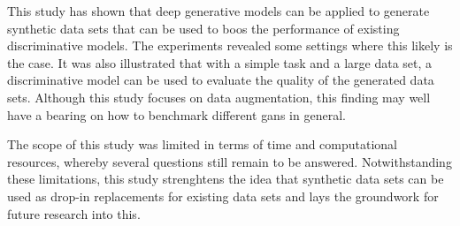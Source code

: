 This study has shown that deep generative models can be applied to generate synthetic data sets that can be used to boos the performance of existing discriminative models. The experiments revealed some settings where this likely is the case. It was also illustrated that with a simple task and a large data set, a discriminative model can be used to evaluate the quality of the generated data sets. Although this study focuses on data augmentation, this finding may well have a bearing on how to benchmark different \acrshort{gans} in general. 

The scope of this study was limited in terms of time and computational resources, whereby several questions still remain to be answered. Notwithstanding these limitations, this study strenghtens the idea that synthetic data sets can be used as drop-in replacements for existing data sets and lays the groundwork for future research into this.
